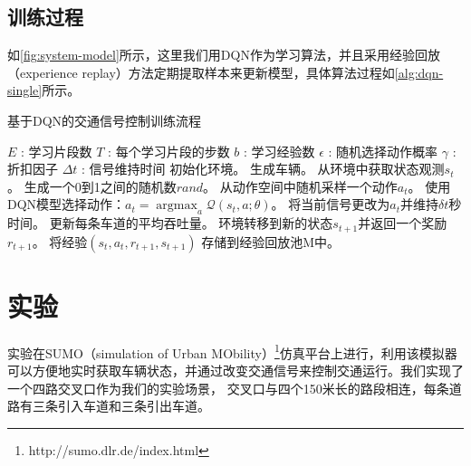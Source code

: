 \subsection*{训练过程}
如\autoref{fig:system-model}所示，这里我们用DQN作为学习算法，并且采用经验回放\cite{mnih2015human}（experience replay）方法定期提取样本来更新模型，具体算法过程如\autoref{alg:dqn-single}所示。
\begin{breakablealgorithm}
    \caption{基于DQN的交通信号控制训练流程}
    \label{alg:dqn-single}
    \begin{algorithmic}[1] %
        \Require 
        $E$ : 学习片段数 \newline
        $T$ : 每个学习片段的步数 \newline
        $b$ : 学习经验数 \newline
        $\epsilon$ : 随机选择动作概率 \newline
        $\gamma$ : 折扣因子 \newline
        $\Delta t$ : 信号维持时间
            \State 初始化环境。
            \State 生成车辆。
                \State 从环境中获取状态观测$s_t$。
                \State 生成一个0到1之间的随机数$rand$。
                    \State 从动作空间中随机采样一个动作$a_t$。
                \Else
                    \State 使用DQN模型选择动作：$a_t = \mathop{\arg\max}_a \mathcal{Q}(s_t,a;\theta)$。
                \EndIf
                \State 将当前信号更改为$a_t$并维持$\delta t$秒时间。
                \State 更新每条车道的平均吞吐量。
                \State 环境转移到新的状态$s_{t+1}$并返回一个奖励$r_{t+1}$。
                \State 将经验$(s_t,a_t,r_{t+1},s_{t+1})$ 存储到经验回放池M中。
                \EndIf
            \EndFor
        \EndFor  
    \end{algorithmic}  
\end{breakablealgorithm}  

\section{实验}
实验在SUMO（simulation of Urban MObility）\footnote{http://sumo.dlr.de/index.html}仿真平台上进行，利用该模拟器可以方便地实时获取车辆状态，并通过改变交通信号来控制交通运行。我们实现了一个四路交叉口作为我们的实验场景，
交叉口与四个150米长的路段相连，每条道路有三条引入车道和三条引出车道。

